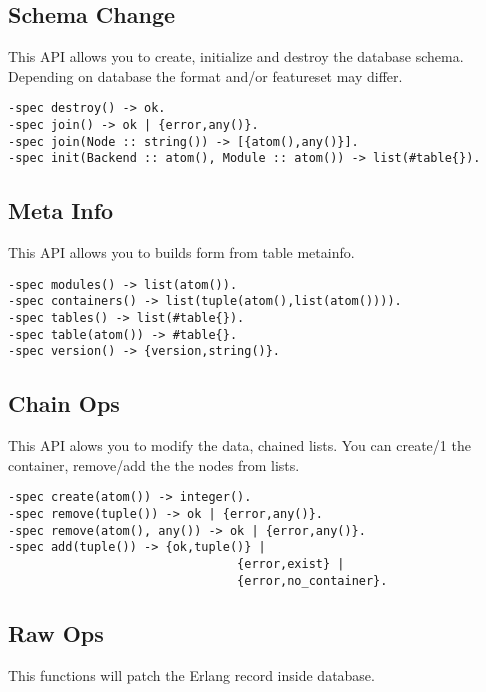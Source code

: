 \subsection{Schema Change}
This API allows you to create, initialize and destroy the database schema.
Depending on database the format and/or featureset may differ.

\vspace{1\baselineskip}
\begin{lstlisting}
-spec destroy() -> ok.
-spec join() -> ok | {error,any()}.
-spec join(Node :: string()) -> [{atom(),any()}].
-spec init(Backend :: atom(), Module :: atom()) -> list(#table{}).
\end{lstlisting}
\vspace{1\baselineskip}

\subsection{Meta Info}
This API allows you to builds form from table metainfo.

\vspace{1\baselineskip}
\begin{lstlisting}
-spec modules() -> list(atom()).
-spec containers() -> list(tuple(atom(),list(atom()))).
-spec tables() -> list(#table{}).
-spec table(atom()) -> #table{}.
-spec version() -> {version,string()}.
\end{lstlisting}
\vspace{1\baselineskip}

\subsection{Chain Ops}
This API alows you to modify the data, chained lists.
You can create/1 the container, remove/add the the nodes from lists.

\vspace{1\baselineskip}
\begin{lstlisting}
-spec create(atom()) -> integer().
-spec remove(tuple()) -> ok | {error,any()}.
-spec remove(atom(), any()) -> ok | {error,any()}.
-spec add(tuple()) -> {ok,tuple()} | 
                                {error,exist} | 
                                {error,no_container}.
\end{lstlisting}
\vspace{1\baselineskip}


\subsection{Raw Ops}
This functions will patch the Erlang record inside database.

